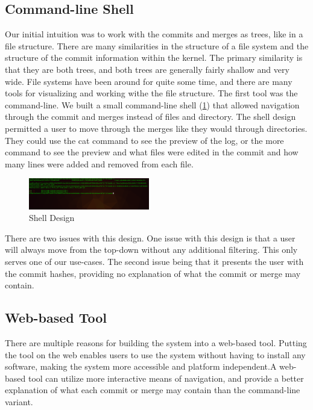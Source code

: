 \documentclass[conference, draftclsnofoot]{IEEEtran}
\begin{document}
\subsection{Command-line Shell}
Our initial intuition was to work with the commits and merges as trees, like in
a file structure. There are many similarities in the structure of a file system
and the structure of the commit information within the kernel. The primary
similarity is that they are both trees, and both trees are generally fairly
shallow and very wide. File systems have been around for quite some time, and
there are many tools for visualizing and working withe the file structure. The
first tool was the command-line. We built a small command-line shell
(\ref{fig:shell}) that allowed navigation through the commit and merges instead
of files and directory. The shell design permitted a user to move through the
merges like they would through directories. They could use the cat command to
see the preview of the log, or the more command to see the preview and what
files were edited in the commit and how many lines were added and removed from
each file.

\begin{figure}[h]
	\centering
	\includegraphics[width=0.47\textwidth]{figures/shell.png}
	\caption{Shell Design}
	\label{fig:shell}
\end{figure}

There are two issues with this design. One issue with this design is that a
user will always move from the top-down without any additional filtering. This
only serves one of our use-cases. The second issue being that it presents the
user with the commit hashes, providing no explanation of what the commit or
merge may contain.

\subsection{Web-based Tool}
There are multiple reasons for building the system into a web-based tool.
Putting the tool on the web enables users to use the system without having to
install any software, making the system more accessible and platform
independent.A web-based tool can utilize more interactive means of navigation,
and provide a better explanation of what each commit or merge may contain than
the command-line variant.
\end{document}
